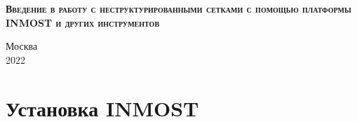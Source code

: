 \documentclass[a4paper, 11pt]{article}
\begin{document}
\begin{titlepage}
	\newpage
	
	\begin{center}
	\end{center}
	
	\vspace{8em}
	
	\begin{center}
	\end{center}
	
	\vspace{2em}
	
	\begin{center}
		\textsc{\textbf{Введение в работу с неструктурированными сетками с помощью платформы INMOST и других инструментов}}
	\end{center}
	
	\vspace{6em}
	
	
	
	\newbox{\lbox}
	\savebox{\lbox}{\hbox{}}
	\newlength{\maxl}
	\setlength{\maxl}{\wd\lbox}
	\hfill\parbox{11cm}{
	}
	
	
	\vspace{\fill}
	
	\begin{center}
		Москва \\ 2022
	\end{center}
	
\end{titlepage}

\setcounter{MaxMatrixCols}{20}


\section{Установка INMOST}
\end{document}
